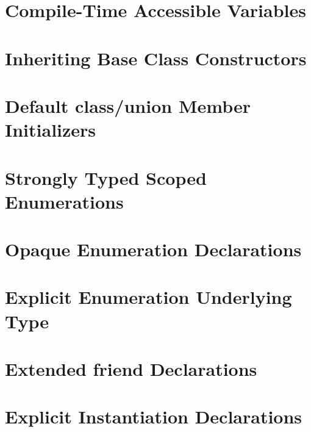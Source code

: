 \newpage
\section[{\tt constexpr} Variables]{Compile-Time Accessible Variables}\label{constexprvar}


\newpage
\section[Inheriting Ctors]{Inheriting Base Class Constructors}\label{ctorinheriting}\label{inheriting-constructors}



\newpage
\section[Default Member Init]{Default {\SecCode class}/{\SecCode union} Member Initializers}\label{Default-Member-Initializers}


\newpage
\section[{\tt enum} {\tt class}]{Strongly Typed Scoped Enumerations}\label{enumclass}


\newpage
\section[Opaque {\tt enum}s]{Opaque Enumeration Declarations}\label{enumopaque}\label{opaque-enumeration-declarations}


\newpage
\section[Underlying Type '11]{Explicit Enumeration Underlying Type}\label{explicit-enumeration-underlying-type}


\newpage
\section[{\tt friend} '11]{Extended {\SecCode friend} Declarations}\label{extended-friend-declarations}


\newpage
\section[{\tt extern} {\tt template}]{Explicit Instantiation Declarations}\label{explicit-template-instantiations}
 

